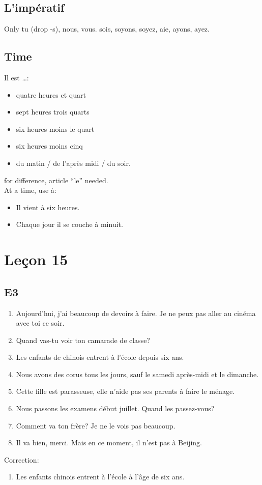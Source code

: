 \documentclass{book}
\begin{document}
    \section{L'impératif}
        Only tu (drop -s), nous, vous. sois, soyons, soyez, aie, ayons, ayez.
    
    \section{Time}
        Il est \dots :
        \begin{itemize}
            \item quatre heures et quart
            \item sept heures trois quarts 
            \item six heures moins le quart
            \item six heures moins cinq
            \item du matin / de l'après midi / du soir.
        \end{itemize}
        for difference, article ``le'' needed. 
        \\
        At a time, use à:
        \begin{itemize}
            \item Il vient à six heures.
            \item Chaque jour il se couche à minuit.
        \end{itemize}

\chapter{Leçon 15}
    \section{E3}
        \begin{enumerate}
            \item Aujourd'hui, j'ai beaucoup de devoirs à faire. Je ne peux pas aller au cinéma avec toi ce soir.
            \item Quand vas-tu voir ton camarade de classe?
            \item Les enfants de chinois entrent à l'école depuis six ans.
            \item Nous avons des corus tous les jours, sauf le samedi après-midi et le dimanche.
            \item Cette fille est parasseuse, elle n'aide pas ses parents à faire le ménage.
            \item Nous passons les examens début juillet. Quand les passez-vous?
            \item Comment va ton frère? Je ne le vois pas beaucoup.
            \item Il va bien, merci. Mais en ce moment, il n'est pas à Beijing.
        \end{enumerate}
        Correction:
        \begin{enumerate}
            \item Les enfants chinois entrent à l'école à l'âge de six ans.
        \end{enumerate}
\end{document}
